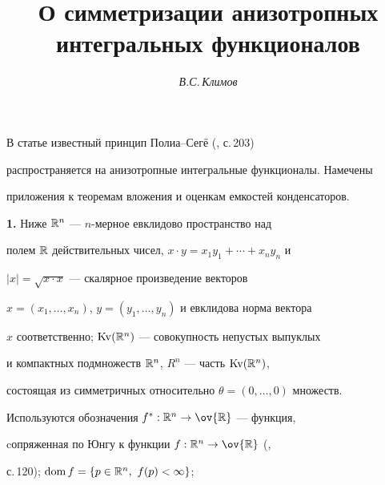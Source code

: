 \author{\it В.С.\,Климов} 




\title{О симметризации анизотропных интегральных функционалов} 


 


\date{} 




\pagestyle{plain} %


 




\maketitle 


\label{begin} 


 


В статье известный принцип Полиа--Сег\"е (\cite{1}, с.\,203) 


распространяется на анизотропные интегральные функционалы. Намечены 


приложения к теоремам вложения и оценкам емкостей конденсаторов. 


\medskip 


 


{\bf 1.} Ниже $\Bbb R^n$ --- $n$-мерное евклидово пространство над 


полем $\Bbb R$ действительных чисел, $x\cdot y=x_1y_1+\dotsb+x_n y_n$ и 


$|x|=\sqrt{x\cdot x}$ --- скалярное произведение векторов 


$x=(x_1,\dotsc,x_n)$, $y=(y_1,\dotsc,y_n)$ и евклидова норма вектора 


$x$ соответственно; $\operatorname{Kv}(\Bbb R^n)$ --- совокупность непустых выпуклых 


и компактных подмножеств $\Bbb R^n$, $R^n$ --- часть $\operatorname{Kv}(\Bbb R^n)$, 


состоящая из симметричных относительно $\theta=(0,\dotsc,0)$ множеств. 


Используются обозначения $f^*:\Bbb R^n\to\ov{\Bbb R}$ --- функция, 


cопряженная по Юнгу к функции $f:\Bbb R^n\to\ov{\Bbb R}$ (\cite{2}, 


с.\,120); $\dom f=\{p\in\Bbb R^n,\ f(p)<\infty\}$; 


